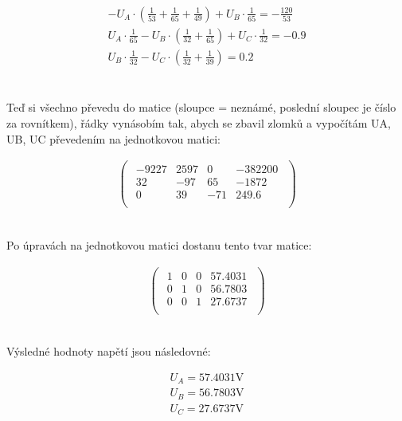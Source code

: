 \\
\begin{gather*}
-U_A \cdot(\frac{1}{53} + \frac{1}{65} + \frac{1}{49}) + U_B \cdot \frac{1}{65} = -\frac{120}{53}\\
U_A \cdot \frac{1}{65} - U_B \cdot (\frac{1}{32} + \frac{1}{65}) + U_C \cdot \frac{1}{32} = - 0.9\\
U_B \cdot \frac{1}{32} - U_C \cdot (\frac{1}{32} + \frac{1}{39}) = 0.2\\
\end{gather*}
\\
\begin{center}
Teď si všechno převedu do matice (sloupce = neznámé, poslední sloupec je číslo za rovnítkem),
řádky vynásobím tak, abych se zbavil zlomků a vypočítám UA, UB, UC převedením na jednotkovou
matici:
\end{center}
\begin{gather*}
\begin{pmatrix}
\begin{array}{ccc|c}
 -9 227 & 2597 & 0 &  -382 200 \\
 32 & -97 & 65  &  -1 872 \\
 0 & 39 & -71 & 249.6 \\
\end{array}
\end{pmatrix}
\end{gather*}
\\
\begin{center}
Po úpravách na jednotkovou matici dostanu tento tvar matice:
\end{center}
\begin{gather*}
\begin{pmatrix}
\begin{array}{ccc|c}
 1 & 0 & 0 &   57.4031 \\
 0 & 1 & 0 &   56.7803 \\
 0 & 0 & 1 &   27.6737 \\
\end{array}
\end{pmatrix}
\end{gather*}
\\
\newpage
\begin{center}
Výsledné hodnoty napětí jsou následovné:
\end{center}
\begin{gather*}
U_A = 57.4031 \text{V}\\
U_B = 56.7803 \text{V}\\
U_C = 27.6737 \text{V}\\
\end{gather*}
